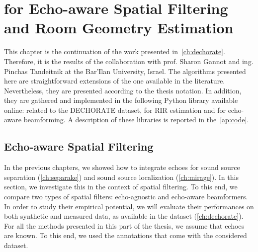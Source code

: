 \chapter{\dEchorate{} for Echo-aware Spatial Filtering and Room Geometry Estimation }\label{ch:dechorateapp}


\vspace{-2.5em}
 \synopsisChDecharateApp



\mynewline
This chapter is the continuation of the work presented in~\cref{ch:dechorate}.
Therefore, it is the results of the collaboration with prof. Sharon Gannot and ing. Pinchas Tandeitnik at the Bar'Ilan University, Israel.
The algorithms presented here are straightforward extensions of the one available in the literature.
Nevertheless, they are presented according to the thesis notation.
In addition, they are  gathered and implemented in the following Python library available online:
 related to the \ac{DECHORATE} dataset,  for \acs{RIR} estimation and  for echo-aware beamforming.
A description of these libraries is reported in the~\cref{ap:code}.

\section{Echo-aware Spatial Filtering}\label{sec:dechorateapp:se}
In the previous chapters, we showed how to integrate echoes for sound source separation (\cref{ch:separake}) and sound source localization (\cref{ch:mirage}).
In this section, we investigate this in the context of spatial filtering.
To this end, we compare two types of spatial filters: echo-agnostic and echo-aware beamformers.
In order to study their empirical potential, we will evaluate their performances on both synthetic and measured data, as available in the \dEchorate{} dataset (\cref{ch:dechorate}).
For all the methods presented in this part of the thesis, we assume that echoes are known.
To this end, we used the annotations that come with the considered dataset.

